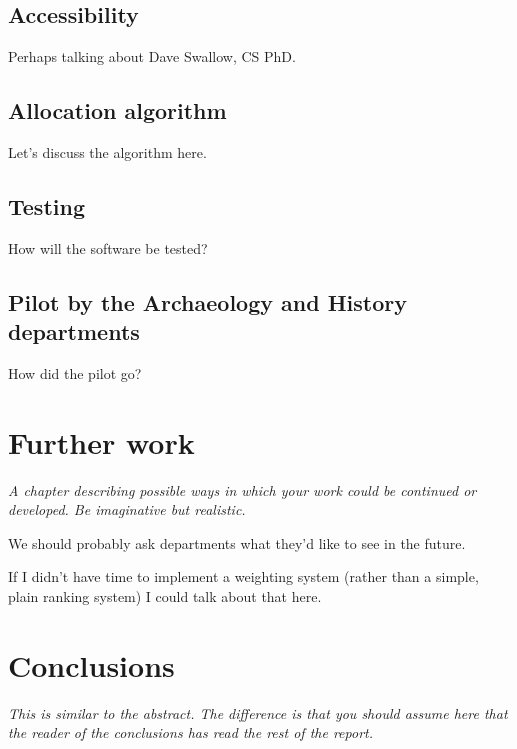 \documentclass[]{scrartcl}
\begin{document}

\subsection{Accessibility}

Perhaps talking about Dave Swallow, CS PhD.

\subsection{Allocation algorithm}

Let's discuss the algorithm here.

\subsection{Testing}

How will the software be tested?

\subsection{Pilot by the Archaeology and History departments}

How did the pilot go?

\section{Further work}

\textit{A chapter describing possible ways in which your work could be continued or developed. Be imaginative but realistic.}

We should probably ask departments what they'd like to see in the future.

If I didn't have time to implement a weighting system (rather than a simple, plain ranking system) I could talk about that here.

\section{Conclusions}

\textit{This is similar to the abstract. The difference is that you should assume here that the reader of the conclusions has read the rest of the report.}
\end{document}
